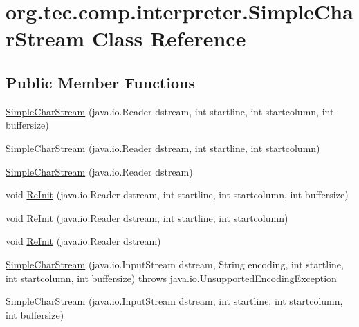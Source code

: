 \hypertarget{classorg_1_1tec_1_1comp_1_1interpreter_1_1_simple_char_stream}{}\section{org.\+tec.\+comp.\+interpreter.\+Simple\+Char\+Stream Class Reference}
\label{classorg_1_1tec_1_1comp_1_1interpreter_1_1_simple_char_stream}
\subsection*{Public Member Functions}
\begin{DoxyCompactItemize}
\item 
\mbox{\hyperlink{classorg_1_1tec_1_1comp_1_1interpreter_1_1_simple_char_stream_af8224bd9f110962e24a43a53e8dce068}{Simple\+Char\+Stream}} (java.\+io.\+Reader dstream, int startline, int startcolumn, int buffersize)
\item 
\mbox{\hyperlink{classorg_1_1tec_1_1comp_1_1interpreter_1_1_simple_char_stream_a932dc7b74df2efc4eef22f7fb867ba2e}{Simple\+Char\+Stream}} (java.\+io.\+Reader dstream, int startline, int startcolumn)
\item 
\mbox{\hyperlink{classorg_1_1tec_1_1comp_1_1interpreter_1_1_simple_char_stream_a61386ecafd16d981ea86e7175e4ea6ff}{Simple\+Char\+Stream}} (java.\+io.\+Reader dstream)
\item 
void \mbox{\hyperlink{classorg_1_1tec_1_1comp_1_1interpreter_1_1_simple_char_stream_a2317dadac16bd1acfe9146a651796fa2}{Re\+Init}} (java.\+io.\+Reader dstream, int startline, int startcolumn, int buffersize)
\item 
void \mbox{\hyperlink{classorg_1_1tec_1_1comp_1_1interpreter_1_1_simple_char_stream_a02c06725307697ed4dbe055e95df1f9e}{Re\+Init}} (java.\+io.\+Reader dstream, int startline, int startcolumn)
\item 
void \mbox{\hyperlink{classorg_1_1tec_1_1comp_1_1interpreter_1_1_simple_char_stream_a183510169ee1618b5b6c2b86c4826ed0}{Re\+Init}} (java.\+io.\+Reader dstream)
\item 
\mbox{\hyperlink{classorg_1_1tec_1_1comp_1_1interpreter_1_1_simple_char_stream_ac926420f46e4c551f69ddd3274f9a812}{Simple\+Char\+Stream}} (java.\+io.\+Input\+Stream dstream, String encoding, int startline, int startcolumn, int buffersize)  throws java.\+io.\+Unsupported\+Encoding\+Exception   
\item 
\mbox{\hyperlink{classorg_1_1tec_1_1comp_1_1interpreter_1_1_simple_char_stream_a691cbf70131a5091cc1f137925b53b31}{Simple\+Char\+Stream}} (java.\+io.\+Input\+Stream dstream, int startline, int startcolumn, int buffersize)

\end{DoxyCompactItemize}

